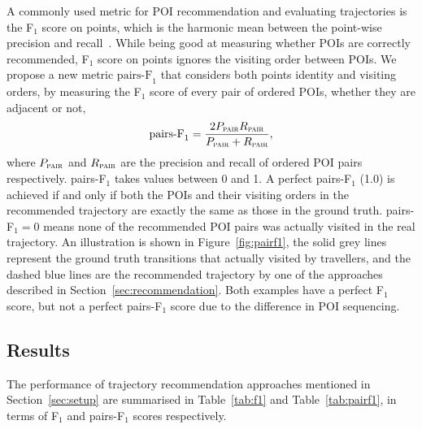 A commonly used metric for POI recommendation and evaluating trajectories is
the F$_1$ score on points, which is the harmonic mean between the point-wise precision and recall~\cite{ijcai15}.
While being good at measuring whether POIs are correctly recommended, 
F$_1$ score on points ignores the visiting order between POIs.
We propose a new metric $\text{pairs-F}_1$ that considers both points identity and visiting orders, 
by measuring the F$_1$ score of every pair of ordered POIs, whether they are adjacent or not,
\begin{displaymath}
\text{pairs-F}_1 = \frac{2 P_{\textsc{pair}} R_{\textsc{pair}}}
                        {P_{\textsc{pair}} + R_{\textsc{pair}}},
\end{displaymath}
where $P_{\textsc{pair}}$ and $R_{\textsc{pair}}$ are the precision and recall of ordered POI pairs respectively.
pairs-F$_1$ takes values between 0 and 1. A perfect pairs-F$_1$ (1.0) is achieved if and only if
both the POIs and their visiting orders in the
recommended trajectory are exactly the same as those in the ground truth.
pairs-F$_1 = 0$ means none of the recommended POI pairs was actually visited in the real trajectory.
An illustration is shown in Figure~\ref{fig:pairf1},
the solid grey lines represent the ground truth transitions that actually visited by travellers,
and the dashed blue lines are the recommended trajectory by one of the approaches described in Section~\ref{sec:recommendation}.
Both examples have a perfect F$_1$ score, but not a perfect pairs-F$_1$ score due to the difference in POI sequencing.



\subsection{Results}
\label{sec:result}
\secmoveup


%
%
%

The performance of trajectory recommendation approaches mentioned in Section~\ref{sec:setup} are summarised in 
Table~\ref{tab:f1} and Table~\ref{tab:pairf1},
in terms of F$_1$ and pairs-F$_1$ scores respectively.




